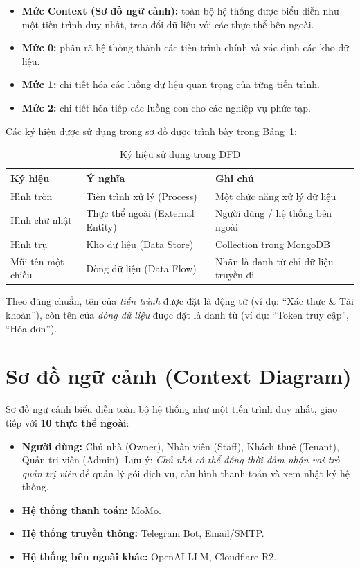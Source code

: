 \documentclass[12pt,a4paper]{report}
\begin{document}
\begin{itemize}[leftmargin=1.2em,itemsep=2pt]
  \item \textbf{Mức Context (Sơ đồ ngữ cảnh):} toàn bộ hệ thống được biểu diễn như một tiến trình duy nhất, trao đổi dữ liệu với các thực thể bên ngoài.
  \item \textbf{Mức 0:} phân rã hệ thống thành các tiến trình chính và xác định các kho dữ liệu.
  \item \textbf{Mức 1:} chi tiết hóa các luồng dữ liệu quan trọng của từng tiến trình.
  \item \textbf{Mức 2:} chi tiết hóa tiếp các luồng con cho các nghiệp vụ phức tạp.
\end{itemize}

Các ký hiệu được sử dụng trong sơ đồ được trình bày trong Bảng~\ref{tab:notation}:

\begin{table}[H]
  \centering
  \caption{Ký hiệu sử dụng trong DFD}
  \label{tab:notation}
  \begin{tabular}{@{}p{4.2cm}p{5cm}p{4.8cm}@{}}
    \toprule
    \textbf{Ký hiệu} & \textbf{Ý nghĩa} & \textbf{Ghi chú} \\
    \midrule
    Hình tròn & Tiến trình xử lý (Process) & Một chức năng xử lý dữ liệu \\
    \addlinespace
    Hình chữ nhật & Thực thể ngoài (External Entity) & Người dùng / hệ thống bên ngoài \\
    \addlinespace
    Hình trụ & Kho dữ liệu (Data Store) & Collection trong MongoDB \\
    \addlinespace
    Mũi tên một chiều & Dòng dữ liệu (Data Flow) & Nhãn là danh từ chỉ dữ liệu truyền đi \\
    \bottomrule
  \end{tabular}
\end{table}

Theo đúng chuẩn, tên của \emph{tiến trình} được đặt là động từ (ví dụ: ``Xác thực \& Tài khoản''), còn tên của \emph{dòng dữ liệu} được đặt là danh từ (ví dụ: ``Token truy cập'', ``Hóa đơn'').

\section{Sơ đồ ngữ cảnh (Context Diagram)}

Sơ đồ ngữ cảnh biểu diễn toàn bộ hệ thống như một tiến trình duy nhất, giao tiếp với \textbf{10 thực thể ngoài}:

\begin{itemize}[leftmargin=1.2em,itemsep=2pt]
  \item \textbf{Người dùng:} Chủ nhà (Owner), Nhân viên (Staff), Khách thuê (Tenant), Quản trị viên (Admin). Lưu ý: \emph{Chủ nhà có thể đồng thời đảm nhận vai trò quản trị viên} để quản lý gói dịch vụ, cấu hình thanh toán và xem nhật ký hệ thống.
  \item \textbf{Hệ thống thanh toán:} MoMo.
  \item \textbf{Hệ thống truyền thông:} Telegram Bot, Email/SMTP.
  \item \textbf{Hệ thống bên ngoài khác:} OpenAI LLM, Cloudflare R2.
\end{itemize}
\end{document}
